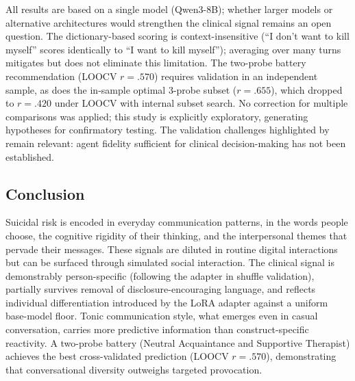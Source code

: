 \documentclass[review,12pt,authoryear]{elsarticle}
\begin{document}
All results are based on a single model (Qwen3-8B); whether larger models or alternative architectures would strengthen the clinical signal remains an open question. The dictionary-based scoring is context-insensitive (``I don't want to kill myself'' scores identically to ``I want to kill myself''); averaging over many turns mitigates but does not eliminate this limitation. The two-probe battery recommendation (LOOCV $r = .570$) requires validation in an independent sample, as does the in-sample optimal 3-probe subset ($r = .655$), which dropped to $r = .420$ under LOOCV with internal subset search. No correction for multiple comparisons was applied; this study is explicitly exploratory, generating hypotheses for confirmatory testing. The validation challenges highlighted by \citet{tornberg2025validation} remain relevant: agent fidelity sufficient for clinical decision-making has not been established.

\subsection{Conclusion}

Suicidal risk is encoded in everyday communication patterns, in the words people choose, the cognitive rigidity of their thinking, and the interpersonal themes that pervade their messages. These signals are diluted in routine digital interactions but can be surfaced through simulated social interaction. The clinical signal is demonstrably person-specific (following the adapter in shuffle validation), partially survives removal of disclosure-encouraging language, and reflects individual differentiation introduced by the LoRA adapter against a uniform base-model floor. Tonic communication style, what emerges even in casual conversation, carries more predictive information than construct-specific reactivity. A two-probe battery (Neutral Acquaintance and Supportive Therapist) achieves the best cross-validated prediction (LOOCV $r = .570$), demonstrating that conversational diversity outweighs targeted provocation.
\end{document}
